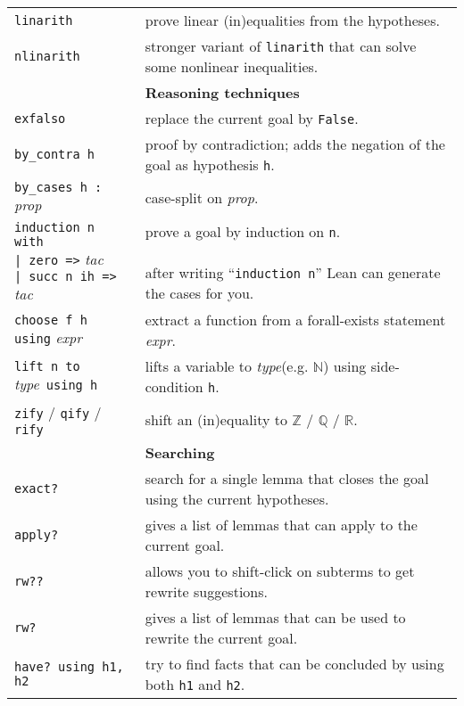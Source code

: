 \documentclass[a4paper]{article}
\newcommand{\lean}[1]{{\tt #1}}
\newcommand{\expr}[1][]{\textit{expr#1}\xspace}
\newcommand{\proposition}{\textit{prop}\xspace}
\newcommand{\tactic}[1][]{\textit{tac#1}\xspace} %
\newcommand{\type}{\textit{type}\xspace}
\newcommand{\light}{\faLightbulbO\xspace}
\begin{document}
\begin{center}
\begin{longtable}{@{}lp{113mm}@{}}
  \lean{linarith} & prove linear (in)equalities from the hypotheses. \\
  \lean{nlinarith} & stronger variant of \lean{linarith} that can solve some nonlinear inequalities. \\
  \hline
  &\textbf{Reasoning techniques}\\
  \lean{exfalso} & replace the current goal by \lean{False}. \\
  \lean{by\_contra h} & proof by contradiction; adds the negation of the goal as hypothesis \lean{h}.\\
  \lean{by\_cases h :} \proposition & case-split on \proposition. \\
  \makecell[lt]{\lean{induction n with }\\ \lean{| zero      =>} \tactic \\ \lean{| succ n ih =>} \tactic} &
  \makecell[lt]{prove a goal by induction on \lean{n}.\\ \\ \light after writing ``\lean{induction n}'' Lean can generate the cases for you.} \\
  \lean{choose f h using} \expr & extract a function from a forall-exists statement \expr.\\
  \lean{lift n to} \type\ \lean{using h} & lifts a variable to \type (e.g. $\mathbb{N}$) using side-condition \lean{h}.\\
  \lean{zify} / \lean{qify} / \lean{rify} & shift an (in)equality to $\mathbb{Z}$ / $\mathbb{Q}$ / $\mathbb{R}$. \\
  \hline
  &\textbf{Searching}\\
  \lean{exact?} & search for a single lemma that closes the goal using the current hypotheses. \\
  \lean{apply?} & gives a list of lemmas that can apply to the current goal. \\
  \lean{rw??} & allows you to shift-click on subterms to get rewrite suggestions. \\
  \lean{rw?} & gives a list of lemmas that can be used to rewrite the current goal. \\
  \lean{have? using h1, h2} & try to find facts that can be concluded by using both \lean{h1} and \lean{h2}. \\

\end{longtable}
\end{center}
\end{document}
